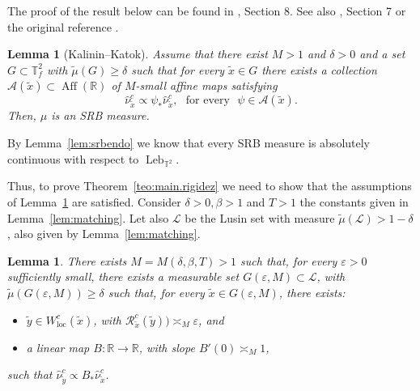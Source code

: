 \documentclass[a4paper,11pt,reqno]{amsart}
\newcommand{\R}{{\mathbb R}}
\newcommand{\TT}{{\mathbb{T}^2}}
\newcommand{\TTf}{{\mathbb{T}_f^2}}
\newcommand{\loc}{{\operatorname{loc}}}
\newcommand{\cA}{{\mathcal A}}
\newcommand{\cL}{{\mathcal L}}
\newcommand{\cR}{{\mathcal R}}
\newcommand{\eps}{\varepsilon}
\newcommand{\tix}{\tilde{x}}
\newcommand{\tm}{\tilde{\mu}}
\newtheorem{lemma}[theorem]{Lemma}
\theoremstyle{definition}
\begin{document}
The proof of the result below can be found in \cite{ALOS}, Section 8. See also \cite{BRH}, Section 7 or the original reference \cite{KalininKatok}.

\begin{lemma}[Kalinin--Katok]
    \label{lem:kksmall}
Assume that there exist $M>1$ and $\delta>0$ and a set $G\subset\TTf$ with $\tm(G)\geq\delta$ such that for every $\tix\in G$ there exists a collection $\cA(\tix)\subset\operatorname{Aff}(\R)$ of $M$-small affine maps satisfying
\[
\hat{\nu}^c_{\tix}\propto\psi_*\hat{\nu}^c_{\tix},\:\:\:\textrm{for every}\:\:\:\psi\in\cA(\tix).
\]
Then, $\mu$ is an SRB measure. 
\end{lemma}

By Lemma~\ref{lem:srbendo} we know that every SRB measure is absolutely continuous with respect to $\operatorname{Leb}_{\TT}$.

Thus, to prove Theorem~\ref{teo:main.rigidez} we need to show that the assumptions of Lemma~\ref{lem:kksmall} are satisfied. Consider $\delta>0,\beta>1$ and $T>1$ the constants given in Lemma~\ref{lem:matching}. Let also $\cL$ be the Lusin set with measure $\tm(\cL)>1-\delta$, also given by Lemma~\ref{lem:matching}.

\begin{lemma}
    \label{lem:main-lemma} 
There exists $M=M(\delta,\beta,T)>1$ such that, for every $\eps>0$ sufficiently small, there exists a measurable set $G(\eps,M)\subset\cL$, with $\tm\left(G(\eps,M)\right)\geq \delta$ such that, for every $\tix\in G(\eps,M)$, there exists:
\begin{itemize}
    \item $\tilde{y}\in W_{\loc}^c(\tix)$, with $\cR^c_{\tix}(\tilde{y}))\asymp_M\eps$, and
    \item a linear map $B:\R\to\R$, with slope $B'(0)\asymp_M1$,
\end{itemize}
such that $\hat{\nu}^c_{\tilde{y}}\propto B_*\hat{\nu}^c_{\tix}$. 
\end{lemma}
\end{document}

